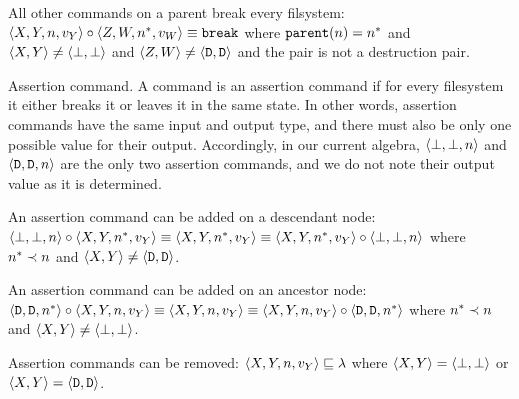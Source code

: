 \begin{myax}\label{ax_directparent_breaks}
All other commands on a parent break every filsystem:
$\langle{X,Y,n,v_Y}\rangle\circ\langle{Z,W,n^*,v_W}\rangle \equiv \mathtt{break}$ where $\mathtt{parent}(n)=n^*$ and $\langle{X,Y}\rangle\neq\langle{\bot,\bot}\rangle$ and $\langle{Z,W}\rangle\neq\langle{\mathtt{D},\mathtt{D}}\rangle$
and the pair is not a destruction pair.
\end{myax}

\begin{mydef}{Assertion command.}
A command is an assertion command if
for every filesystem it either breaks it or leaves it in the same state.
In other words, assertion commands have the same input and output type,
and there must also be only one possible value for their output.
Accordingly, in our current algebra, $\langle{\bot,\bot,n}\rangle$ and $\langle{\mathtt{D},\mathtt{D},n}\rangle$ are the only two assertion commands,
and we do not note their output value as it is determined.
\end{mydef}

\begin{myax}\label{ax_child_assert}
An assertion command can be added on a descendant node:
$\langle{\bot,\bot,n}\rangle\circ\langle{X,Y,n^*,v_Y}\rangle \equiv \langle{X,Y,n^*,v_Y}\rangle \equiv \langle{X,Y,n^*,v_Y}\rangle\circ\langle{\bot,\bot,n}\rangle$ 
where $n^*\prec n$ and $\langle{X,Y}\rangle\neq\langle{\mathtt{D},\mathtt{D}}\rangle$.
\end{myax}

\begin{myax}\label{ax_parent_assert}
An assertion command can be added on an ancestor node:
$\langle{\mathtt{D},\mathtt{D},n^*}\rangle\circ\langle{X,Y,n,v_Y}\rangle \equiv \langle{X,Y,n,v_Y}\rangle \equiv \langle{X,Y,n,v_Y}\rangle\circ\langle{\mathtt{D},\mathtt{D},n^*}\rangle$ 
where $n^*\prec n$ and $\langle{X,Y}\rangle\neq\langle{\bot,\bot}\rangle$.
\end{myax}

\begin{myax}\label{ax_assert}
Assertion commands can be removed:
$\langle{X,Y,n,v_Y}\rangle \sqsubseteq \lambda$ where $\langle{X,Y}\rangle=\langle{\bot,\bot}\rangle$ or $\langle{X,Y}\rangle=\langle{\mathtt{D},\mathtt{D}}\rangle$.
\end{myax}
